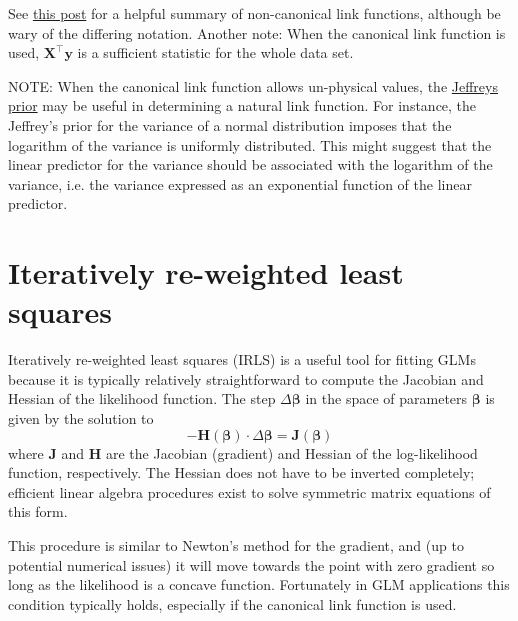 \documentclass{article}
\newcommand{\bbeta}{\boldsymbol{\beta}}
\begin{document}
See \href{https://stats.stackexchange.com/questions/40876/what-is-the-difference-between-a-link-function-and-a-canonical-link-function}{this post}
for a helpful summary of non-canonical link functions, although be wary of the
differing notation.
Another note: When the canonical link function is used, \(\mathbf{X}^\intercal
\mathbf{y}\) is a sufficient statistic for the whole data set.

NOTE: When the canonical link function allows un-physical values, the
\href{https://en.wikipedia.org/wiki/Jeffreys_prior}{Jeffreys prior} may be
useful in determining a natural link function. For instance, the Jeffrey's
prior for the variance of a normal distribution imposes that the logarithm of
the variance is uniformly distributed. This might suggest that the linear
predictor for the variance should be associated with the logarithm of the
variance, i.e. the variance expressed as an exponential function of the linear
predictor.


\section{Iteratively re-weighted least squares}

Iteratively re-weighted least squares (IRLS) is a useful tool for fitting GLMs
because it is typically relatively straightforward to compute the Jacobian and
Hessian of the likelihood function. The step \(\Delta \bbeta\) in
the space of parameters \(\bbeta\) is given by the solution to
\[ -\mathbf{H}(\bbeta) \cdot \Delta\bbeta = \mathbf{J}(\bbeta) \]
where \(\mathbf{J}\) and \(\mathbf{H}\) are the Jacobian (gradient) and
Hessian of the log-likelihood function, respectively. The Hessian does not have
to be inverted completely; efficient linear algebra procedures exist to solve
symmetric matrix equations of this form.

This procedure is similar to Newton's method for the gradient, and (up to
potential numerical issues) it will move towards the point with zero gradient so
long as the likelihood is a concave function. Fortunately in GLM applications
this condition typically holds, especially if the canonical link function is
used.
\end{document}
